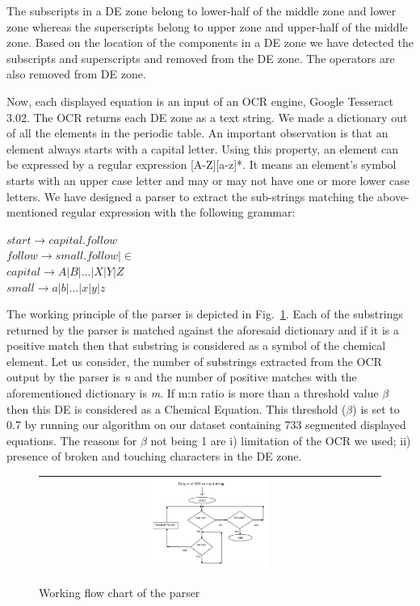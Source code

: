 \documentclass[12pt]{IEEEtran}
\begin{document}
\begin{itemize}
The subscripts in a DE zone belong to lower-half of the middle zone and lower zone whereas the superscripts belong to upper zone and
upper-half of the middle zone. Based on the location of the components in a DE zone we have detected the subscripts and superscripts
and removed from the DE zone. The operators are also removed from DE zone.

Now, each displayed equation is an input of  an OCR engine, Google Tesseract 3.02.
The OCR returns each DE zone as a text string.
We made a dictionary out of all the elements in the periodic table. An important observation is that an element always starts with a capital letter. Using this property,
an element can be expressed by a regular expression [A-Z][a-z]*. 
It means an element's symbol
starts with an upper case letter and may or may not have one or more lower case letters. 
We have designed a parser to extract the sub-strings matching the above-mentioned regular expression with the following grammar:\\
\begin{center}
$start \rightarrow capital.follow$\\
$follow \rightarrow small.follow | \in$\\
$capital \rightarrow A|B| \dots |X|Y|Z$\\
$small \rightarrow a|b| \dots |x|y|z$\\
\end{center}

The working principle of the parser is depicted in Fig.~\ref{flow_chart}.
Each of the substrings returned by the parser is matched against the aforesaid dictionary and if it is a positive match then 
that substring is considered as a symbol of the chemical element. 
Let us consider, the number of substrings extracted from the OCR output by the parser is {\em n}  and the number of positive matches with 
the aforementioned dictionary is {\em m}.
If m:n ratio is more than a threshold value $\beta$ then this DE is considered as a Chemical Equation. 
This threshold ($\beta$) is set to 0.7 by running our algorithm on our dataset containing 733 segmented displayed equations. 
The reasons for $\beta$ not being 1 are
i) limitation of the OCR we used;
ii) presence of broken and touching characters in the DE zone.

\begin{figure}[h]\center\footnotesize
\begin{tabular}{|c|}
\hline
 \includegraphics[width=0.35\textwidth]{flowchart.png} \\ \hline
 \end{tabular} 
 \caption{Working flow chart of the parser}
 \label{flow_chart}
\end{figure}
\end{itemize}
\end{document}
